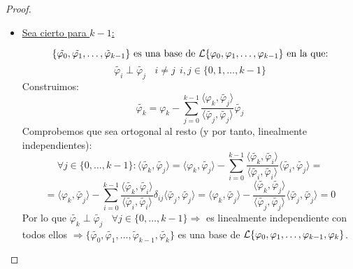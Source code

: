 \begin{proof}
\begin{itemize}
        \item \underline{Sea cierto para $k-1$:}

        $$\{\tilde{\varphi_0}, \tilde{\varphi_1}, \ldots, \tilde{\varphi}_{k-1}\} \mbox{ es una base de }
        \mathcal{L}\{\varphi_0, \varphi_1, \ldots, \varphi_{k-1}\} \mbox{ en la que:}$$
    $$\tilde{\varphi_i} \perp \tilde{\varphi_j}~~~~ i \neq j~~ i,j \in \{0, 1, \ldots, k-1\}$$
    Construimos:
    $$\tilde{\varphi_k} = \varphi_k - \sum_{j=0}^{k-1} \dfrac{\langle \varphi_k, \tilde{\varphi_j} \rangle}
        {\langle \tilde{\varphi_j}, \tilde{\varphi_j} \rangle} \tilde{\varphi_j}$$
    Comprobemos que sea ortogonal al resto (y por tanto, linealmente independientes):
    $$\forall j \in \{0, \ldots, k-1\}: \langle \tilde{\varphi_k}, \tilde{\varphi_j} \rangle = \langle \varphi_k,
        \tilde{\varphi_j} \rangle - \sum_{i=0}^{k-1} \dfrac{\langle \tilde{\varphi_k}, \tilde{\varphi_i} \rangle}
        {\langle \tilde{\varphi_i}, \tilde{\varphi_i} \rangle} \langle \tilde{\varphi_i}, \tilde{\varphi_j} \rangle=$$
    $$= \langle \varphi_k, \tilde{\varphi_j} \rangle - \sum_{i=0}^{k-1} \dfrac{\langle \tilde{\varphi_k},
            \tilde{\varphi_i} \rangle} {\langle \tilde{\varphi_i}, \tilde{\varphi_i} \rangle} \delta_{ij} \langle \tilde{\varphi_j},
        \tilde{\varphi_j} \rangle = \langle \varphi_k,
        \tilde{\varphi_j} \rangle - \dfrac{\langle \tilde{\varphi_k}, \tilde{\varphi_j} \rangle}
        {\langle \tilde{\varphi_j}, \tilde{\varphi_j} \rangle} \langle \tilde{\varphi_j}, \tilde{\varphi_j} \rangle = 0$$
    Por lo que $\tilde{\varphi_k} \perp \tilde{\varphi_j}~~~~\forall j \in \{0, \ldots, k-1\} \Rightarrow$ es linealmente
    independiente con todos ellos $\Rightarrow \{\tilde{\varphi_0}, \tilde{\varphi_1}, \ldots, \tilde{\varphi}_{k-1},
        \tilde{\varphi_k}\}$ es una base de $\mathcal{L}\{\varphi_0, \varphi_1, \ldots, \varphi_{k-1}, \varphi_k\}$.
    \end{itemize}
    
\end{proof}


